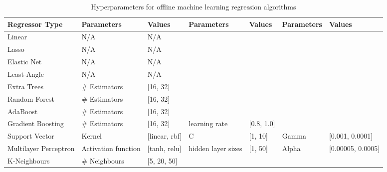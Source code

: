 \begin{table}
\centering
\begin{tabular}{@{}lllllll@{}}
\toprule
\textbf{Regressor Type} & \textbf{Parameters} & \textbf{Values}   & \textbf{Parameters} & \textbf{Values} & \textbf{Parameters} & \textbf{Values}       \\ \midrule
Linear                  & N/A                 & N/A               &                     &                 &                     &                       \\
Lasso                   & N/A                 & N/A               &                     &                 &                     &                       \\
Elastic Net             & N/A                 & N/A               &                     &                 &                     &                       \\
Least-Angle             & N/A                 & N/A               &                     &                 &                     &                       \\
Extra Trees             & \# Estimators       & {[}16, 32{]}      &                     &                 &                     &                       \\
Random Forest           & \# Estimators       & {[}16, 32{]}      &                     &                 &                     &                       \\
AdaBoost                & \# Estimators       & {[}16, 32{]}      &                     &                 &                     &                       \\
Gradient Boosting       & \# Estimators       & {[}16, 32{]}      & learning rate       & {[}0.8, 1.0{]}  &                     &                       \\
Support Vector          & Kernel              & {[}linear, rbf{]} & C                   & {[}1, 10{]}     & Gamma               & {[}0.001, 0.0001{]}   \\
Multilayer Perceptron   & Activation function & {[}tanh, relu{]}  & hidden layer sizes  & {[}1, 50{]}     & Alpha               & {[}0.00005, 0.0005{]} \\
K-Neighbours            & \# Neighbours       & {[}5, 20, 50{]}   &                     &                 &                     &                       \\ \bottomrule
\end{tabular}%
\caption{Hyperparameters for offline machine learning regression algorithms}
\label{table:hyperparameter-tuning-offline}


\end{table}
